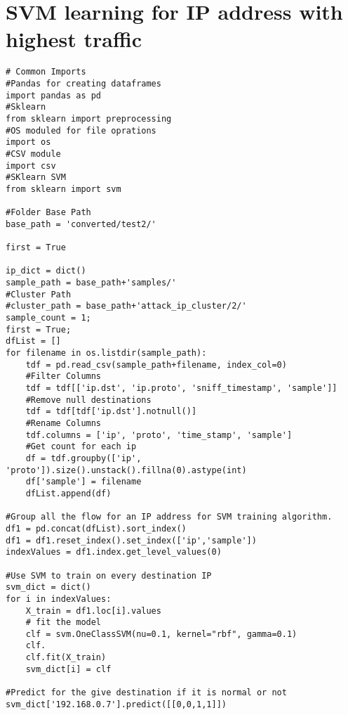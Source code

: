 \documentclass{report}
\begin{document}
\section{SVM learning for IP address with highest traffic}
\begin{verbatim}
# Common Imports
#Pandas for creating dataframes
import pandas as pd
#Sklearn
from sklearn import preprocessing
#OS moduled for file oprations
import os
#CSV module
import csv
#SKlearn SVM
from sklearn import svm

#Folder Base Path
base_path = 'converted/test2/'

first = True

ip_dict = dict()
sample_path = base_path+'samples/'
#Cluster Path
#cluster_path = base_path+'attack_ip_cluster/2/'
sample_count = 1;
first = True;
dfList = []
for filename in os.listdir(sample_path):
    tdf = pd.read_csv(sample_path+filename, index_col=0)
    #Filter Columns
    tdf = tdf[['ip.dst', 'ip.proto', 'sniff_timestamp', 'sample']]
    #Remove null destinations
    tdf = tdf[tdf['ip.dst'].notnull()]
    #Rename Columns
    tdf.columns = ['ip', 'proto', 'time_stamp', 'sample']
    #Get count for each ip
    df = tdf.groupby(['ip', 'proto']).size().unstack().fillna(0).astype(int)
    df['sample'] = filename
    dfList.append(df)

#Group all the flow for an IP address for SVM training algorithm.
df1 = pd.concat(dfList).sort_index()
df1 = df1.reset_index().set_index(['ip','sample'])
indexValues = df1.index.get_level_values(0)

#Use SVM to train on every destination IP
svm_dict = dict()
for i in indexValues:
    X_train = df1.loc[i].values
    # fit the model
    clf = svm.OneClassSVM(nu=0.1, kernel="rbf", gamma=0.1)
    clf.
    clf.fit(X_train)
    svm_dict[i] = clf

#Predict for the give destination if it is normal or not
svm_dict['192.168.0.7'].predict([[0,0,1,1]])

\end{verbatim}
\end{document}
